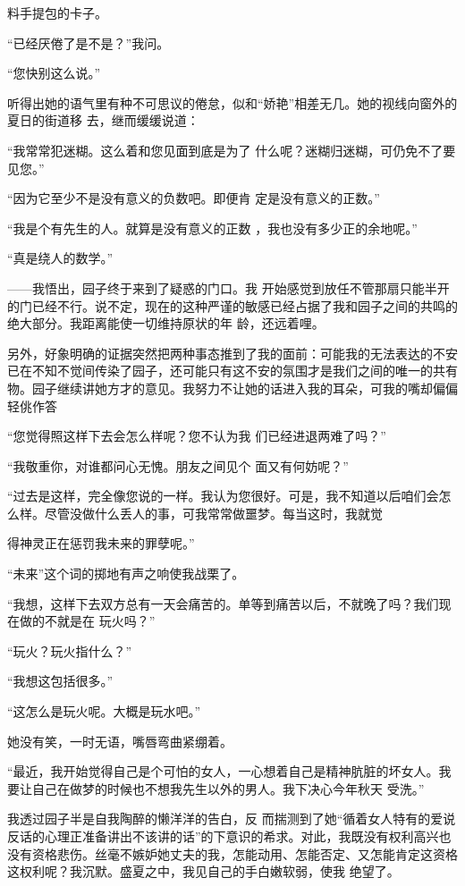 \documentclass{article}
\begin{document}
\newpage
料手提包的卡子。 


“已经厌倦了是不是？”我问。 


“您快别这么说。” 

听得出她的语气里有种不可思议的倦怠，似和“娇艳”相差无几。她的视线向窗外的夏日的街道移
去，继而缓缓说道： 

“我常常犯迷糊。这么着和您见面到底是为了
什么呢？迷糊归迷糊，可仍免不了要见您。” 

“因为它至少不是没有意义的负数吧。即便肯
定是没有意义的正数。” 

“我是个有先生的人。就算是没有意义的正数
，我也没有多少正的余地呢。” 


“真是绕人的数学。” 

——我悟出，园子终于来到了疑惑的门口。我
\newpage
开始感觉到放任不管那扇只能半开的门已经不行。说不定，现在的这种严谨的敏感已经占据了我和园子之间的共鸣的绝大部分。我距离能使一切维持原状的年
龄，还远着哩。 

另外，好象明确的证据突然把两种事态推到了我的面前：可能我的无法表达的不安已在不知不觉间传染了园子，还可能只有这不安的氛围才是我们之间的唯一的共有物。园子继续讲她方才的意见。我努力不让她的话进入我的耳朵，可我的嘴却偏偏轻佻作答

“您觉得照这样下去会怎么样呢？您不认为我
们已经进退两难了吗？” 

“我敬重你，对谁都问心无愧。朋友之间见个
面又有何妨呢？” 

“过去是这样，完全像您说的一样。我认为您很好。可是，我不知道以后咱们会怎么样。尽管没做什么丢人的事，可我常常做噩梦。每当这时，我就觉

\newpage
得神灵正在惩罚我未来的罪孽呢。” 

“未来”这个词的掷地有声之响使我战栗了。

“我想，这样下去双方总有一天会痛苦的。单等到痛苦以后，不就晚了吗？我们现在做的不就是在
玩火吗？” 


“玩火？玩火指什么？” 


“我想这包括很多。” 


“这怎么是玩火呢。大概是玩水吧。” 


她没有笑，一时无语，嘴唇弯曲紧绷着。 

“最近，我开始觉得自己是个可怕的女人，一心想着自己是精神肮脏的坏女人。我要让自己在做梦的时候也不想我先生以外的男人。我下决心今年秋天
受洗。” 

我透过园子半是自我陶醉的懒洋洋的告白，反
\newpage
而揣测到了她“循着女人特有的爱说反话的心理正准备讲出不该讲的话”的下意识的希求。对此，我既没有权利高兴也没有资格悲伤。丝毫不嫉妒她丈夫的我，怎能动用、怎能否定、又怎能肯定这资格这权利呢？我沉默。盛夏之中，我见自己的手白嫩软弱，使我
绝望了。 
\end{document}
